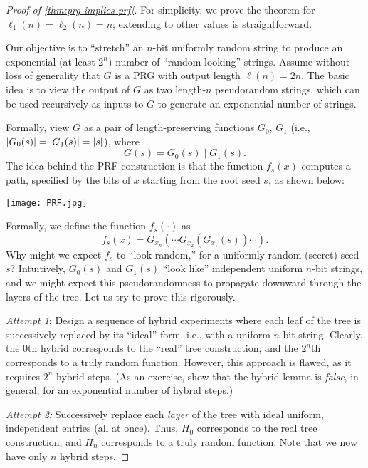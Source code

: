 \documentclass[11pt]{article}
\begin{document}
\begin{proof}[Proof of \cref{thm:prg-implies-prf}]
  For simplicity, we prove the theorem for $\ell_{1}(n) = \ell_{2}(n)
  = n$; extending to other values is straightforward.

  Our objective is to ``stretch'' an $n$-bit uniformly random string
  to produce an exponential (at least $2^{n}$) number of
  ``random-looking'' strings.  Assume without loss of generality that
  $G$ is a PRG with output length $\ell(n) = 2n$.  The basic idea is
  to view the output of $G$ as two length-$n$ pseudorandom strings,
  which can be used recursively as inputs to $G$ to generate an
  exponential number of strings.

  Formally, view $G$ as a pair of length-preserving functions $G_{0}$,
  $G_{1}$ (i.e., $\lvert G_{0}(s)\rvert = \lvert G_{1}(s)\rvert = \lvert s\rvert$), where
  \[ G(s) = G_{0}(s) \mid G_{1}(s). \] The idea behind the PRF
  construction is that the function $f_{s}(x)$ computes a path,
  specified by the bits of $x$ starting from the root seed $s$, as
  shown below:
  \begin{center}
    \texttt{[image: PRF.jpg]}
  \end{center}

  Formally, we define the function $f_{s}(\cdot)$ as
  \[f_{s}(x) = G_{x_{n}}(\cdots G_{x_{2}}(G_{x_{1}}(s)) \cdots). \]
  Why might we expect $f_{s}$ to ``look random,'' for a uniformly
  random (secret) seed $s$?  Intuitively, $G_{0}(s)$ and $G_{1}(s)$
  ``look like'' independent uniform $n$-bit strings, and we might
  expect this pseudorandomness to propagate downward through the
  layers of the tree.  Let us try to prove this rigorously.

  \emph{Attempt 1}: Design a sequence of hybrid experiments where each
  leaf of the tree is successively replaced by its ``ideal'' form,
  i.e., with a uniform $n$-bit string.  Clearly, the $0$th hybrid
  corresponds to the ``real'' tree construction, and the $2^{n}$th
  corresponds to a truly random function.  However, this approach is
  flawed, as it requires $2^n$ hybrid steps.  (As an exercise, show
  that the hybrid lemma is \emph{false}, in general, for an
  exponential number of hybrid steps.)

  \emph{Attempt 2:} Successively replace each \emph{layer} of the tree
  with ideal uniform, independent entries (all at once).  Thus,
  $H_{0}$ corresponds to the real tree construction, and $H_{n}$
  corresponds to a truly random function.  Note that we now have only
  $n$ hybrid steps.


\end{proof}
\end{document}
